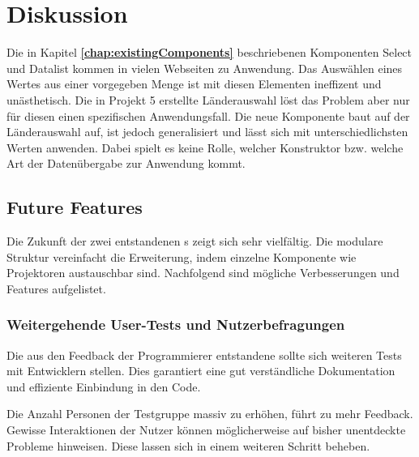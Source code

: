 \chapter{Diskussion}
\label{chap:discussion}

Die in Kapitel \textbf{\ref{chap:existingComponents}} beschriebenen Komponenten Select und Datalist kommen in vielen Webseiten zu Anwendung.
Das Auswählen eines Wertes aus einer vorgegeben Menge ist mit diesen Elementen ineffizent und unästhetisch.
Die in Projekt 5 erstellte Länderauswahl löst das Problem aber nur für diesen einen spezifischen Anwendungsfall.
Die neue Komponente  baut auf der Länderauswahl auf, ist jedoch generalisiert und lässt sich mit unterschiedlichsten Werten anwenden.
Dabei spielt es keine Rolle, welcher Konstruktor bzw. welche Art der Datenübergabe zur Anwendung kommt. 



\section{Future Features}
\label{sec:future}

Die Zukunft der zwei entstandenen s zeigt sich sehr vielfältig.
Die modulare Struktur vereinfacht die Erweiterung, indem einzelne Komponente wie Projektoren austauschbar sind.
Nachfolgend sind mögliche Verbesserungen und Features aufgelistet.


\subsection{Weitergehende User-Tests und Nutzerbefragungen}
\label{sec:moreUserTests}

Die aus den Feedback der Programmierer entstandene  sollte sich weiteren Tests mit Entwicklern stellen. 
Dies garantiert eine gut verständliche Dokumentation und effiziente Einbindung in den Code.

Die Anzahl Personen der Testgruppe massiv zu erhöhen, führt zu mehr Feedback.
Gewisse Interaktionen der Nutzer können möglicherweise auf bisher unentdeckte Probleme hinweisen.
Diese lassen sich in einem weiteren Schritt beheben.

